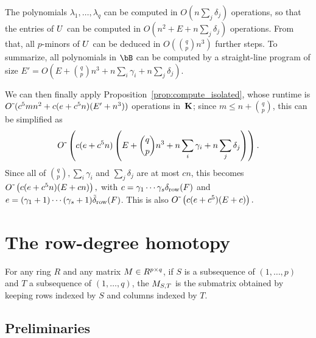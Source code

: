 \documentclass[12pt]{article}
\begin{document}
The polynomials $\lambda_1,\dots,\lambda_q$ can be computed in $O(n \sum_j
\delta_j)$ operations, so that the entries of ${U}$ can be computed in
$O(n^2 + E + n \sum_j \delta_j)$ operations. From that, all $p$-minors
of ${U}$ can be deduced in $O({q \choose p} n^3)$ further steps.
To summarize, all polynomials in $\bB$ can be computed by a straight-line
program of size
$E'=O(E + {q \choose p} n^3 +n \sum_i \gamma_i + n \sum_j \delta_j)$.

\medskip

We can then finally apply Proposition~\ref{prop:compute_isolated},
whose runtime is ${O}{\,\tilde{ }\,}(c^5 m n^2 + c(e+c^5 n)(E' + n^3))$ operations
in~$\mathbf{K}$; since $m \le n + {q \choose p}$, this can be simplified as
$${O}{\,\tilde{ }\,}\left (c(e+c^5 n)\left(E + {q \choose p} n^3 +n \sum_i
\gamma_i + n \sum_j \delta_j\right)\right).$$ Since all of $ {q
  \choose p}, \sum_i \gamma_i$ and $\sum_j \delta_j$ are at most $cn$, this becomes ${O}{\,\tilde{ }\,}\left (c(e+c^5 n)(E + cn)\right),$
with $c=\gamma_1\cdots\gamma_s \delta_{\rm row}({F})$ and
$e=(\gamma_1+1)\cdots(\gamma_s+1) \tilde\delta_{\rm row}({F})$.
This is also  ${O}{\,\tilde{ }\,}\left (c(e+c^5 )(E + c)\right).$



\section{The row-degree homotopy}\label{sec:rowdegree}

For any ring $R$ and any matrix ${M} \in R^{p\times q}$, if $S$ is a
subsequence of $(1,\dots,p)$ and $T$ a subsequence of $(1,\dots,q)$,
the ${M}_{S,T}$ is the submatrix obtained by keeping rows indexed by
$S$ and columns indexed by $T$.


\subsection{Preliminaries}
\end{document}
